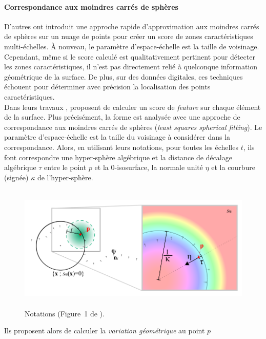 \paragraph{Correspondance aux moindres carrés de sphères}%
\label{sec:applications:feature:growing}
%
D'autres \cite{Mellado2012} ont introduit une approche rapide d'approximation
aux moindres carrés de sphères sur un nuage de points pour créer un score de
zones caractéristiques multi-échelles. À nouveau, le paramètre d'espace-échelle
est la taille de voisinage. Cependant, même si le score calculé est
qualitativement pertinent pour détecter les zones caractéristiques, il n'est pas
directement relié à quelconque information géométrique de la surface. De plus,
sur des données digitales, ces techniques échouent pour déterminer avec
précision la localisation des points caractéristiques.
%
\\
%
Dans leurs travaux \cite{Mellado2012},  proposent de calculer
un score de \emph{feature} sur chaque élément de la surface. Plus précisément,
la forme est analysée avec une approche de correspondance aux moindres carrés de
sphères (\emph{least squares spherical fitting}). Le paramètre d'espace-échelle
est la taille du voisinage à considérer dans la correspondance. Alors, en
utilisant leurs notations, pour toutes les échelles $t$, ils font correspondre
une hyper-sphère algébrique et la distance de décalage algébrique $\tau$ entre
le point $p$ et la $0$-isosurface, la normale unité $\eta$ et la courbure
(signée) $\kappa$ de l'hyper-sphère.
%
\begin{figure}[ht]{
    \begin{center}
    \includegraphics[height=6cm]{images/Feature/Mellado_notations}
    \end{center}}
    \caption[Notations.]{Notations (Figure~1 de \cite{Mellado2012}).
      \label{fig:mellado-notations}}
\end{figure}
%
Ils proposent alors de calculer la \emph{variation géométrique} au point $p$
